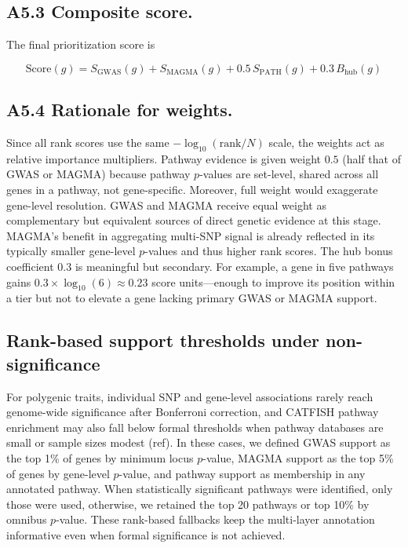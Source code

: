 \documentclass[unnumsec,webpdf,contemporary,large]{oup-authoring-template}%
\theoremstyle{thmstyleone}%
\theoremstyle{thmstyletwo}%
\theoremstyle{thmstylethree}%
\begin{document}
\begin{appendices}
\subsection{A5.3 Composite score.}

The final prioritization score is

\[
\mathrm{Score}(g)
= S_{\mathrm{GWAS}}(g)
+ S_{\mathrm{MAGMA}}(g)
+ 0.5\,S_{\mathrm{PATH}}(g)
+ 0.3\,B_{\mathrm{hub}}(g)
\]

\subsection{A5.4 Rationale for weights.}
Since all rank scores use the same $-\log_{10}(\mathrm{rank}/N)$ scale, the weights act as relative importance multipliers. Pathway evidence is given weight $0.5$ (half that of GWAS or MAGMA) because pathway $p$-values are set-level, shared across all genes in a pathway, not gene-specific. Moreover, full weight would exaggerate gene-level resolution. GWAS and MAGMA receive equal weight as complementary but equivalent sources of direct genetic evidence at this stage. MAGMA’s benefit in aggregating multi-SNP signal is already reflected in its typically smaller gene-level $p$-values and thus higher rank scores. The hub bonus coefficient $0.3$ is meaningful but secondary. For example, a gene in five pathways gains $0.3\times\log_{10}(6)\approx 0.23$ score units—enough to improve its position within a tier but not to elevate a gene lacking primary GWAS or MAGMA support.

\subsection{Rank-based support thresholds under non-significance}
For polygenic traits, individual SNP and gene-level associations rarely reach genome-wide significance after Bonferroni correction, and CATFISH pathway enrichment may also fall below formal thresholds when pathway databases are small or sample sizes modest (ref). In these cases, we defined GWAS support as the top 1\% of genes by minimum locus $p$-value, MAGMA support as the top 5\% of genes by gene-level $p$-value, and pathway support as membership in any annotated pathway. When statistically significant pathways were identified, only those were used, otherwise, we retained the top 20 pathways or top 10\% by omnibus $p$-value. These rank-based fallbacks keep the multi-layer annotation informative even when formal significance is not achieved.



\end{appendices}
\end{document}
